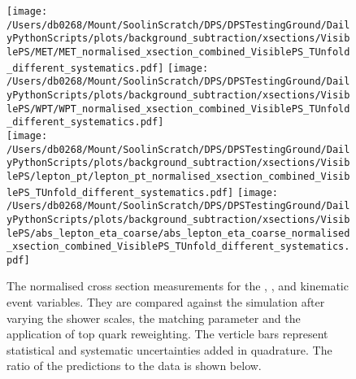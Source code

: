 \begin{figure}[hp]
	\centering
	\texttt{[image: /Users/db0268/Mount/SoolinScratch/DPS/DPSTestingGround/DailyPythonScripts/plots/background\_subtraction/xsections/VisiblePS/MET/MET\_normalised\_xsection\_combined\_VisiblePS\_TUnfold\_different\_systematics.pdf]}
	\texttt{[image: /Users/db0268/Mount/SoolinScratch/DPS/DPSTestingGround/DailyPythonScripts/plots/background\_subtraction/xsections/VisiblePS/WPT/WPT\_normalised\_xsection\_combined\_VisiblePS\_TUnfold\_different\_systematics.pdf]} \\
	\texttt{[image: /Users/db0268/Mount/SoolinScratch/DPS/DPSTestingGround/DailyPythonScripts/plots/background\_subtraction/xsections/VisiblePS/lepton\_pt/lepton\_pt\_normalised\_xsection\_combined\_VisiblePS\_TUnfold\_different\_systematics.pdf]} 
	\texttt{[image: /Users/db0268/Mount/SoolinScratch/DPS/DPSTestingGround/DailyPythonScripts/plots/background\_subtraction/xsections/VisiblePS/abs\_lepton\_eta\_coarse/abs\_lepton\_eta\_coarse\_normalised\_xsection\_combined\_VisiblePS\_TUnfold\_different\_systematics.pdf]}
 	\caption[The normalised cross section measurements for the \ptmiss{}, \WPT{}, \LPT{} and \LETA{} kinematic event variables. They are compared against the \powhegpythia{} simulation after varying the shower scales, the \hdamp{} matching parameter and the application of top quark \pt{} reweighting. The verticle bars represent statistical and systematic uncertainties added in quadrature. The ratio of the predictions to the data is shown below.]{The normalised cross section measurements for the \ptmiss{}, \WPT{}, \LPT{} and \LETA{} kinematic event variables. They are compared against the \powhegpythia{} simulation after varying the shower scales, the \hdamp{} matching parameter and the application of top quark \pt{} reweighting. The verticle bars represent statistical and systematic uncertainties added in quadrature. The ratio of the predictions to the data is shown below.}
	\label{fig:combXSecSysNorm2}
\end{figure}



